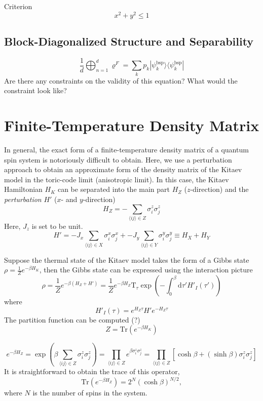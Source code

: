 \documentclass[12font]{article}
\numberwithin{equation}{section}    %
\theoremstyle{definition}
\newcommand{\bra}[1]{\langle #1 |}
\newcommand{\ket}[1]{| #1 \rangle}
\newcommand{\anglelr}[1]{\langle #1 \rangle}
\newcommand{\lr}[1]{\left(  #1  \right)}
\newcommand{\lrm}[1]{\left[  #1  \right]}
\newcommand{\mrm}[1]{\mathrm{#1}}
\newcommand{\alert}[1]{{\color{red}#1}}
\newcommand{\Tr}{\mrm{Tr}}
\begin{document}
Criterion
\[
x^2 + y^2 \leq 1
\]

\subsection{Block-Diagonalized Structure and Separability}

\[
\frac{1}{d}\bigoplus_{n=1}^{d}\varrho^F = \sum_{k} p_k \ket{\psi^{\mrm{bsp}}_k} \bra{\psi^{\mrm{bsp}}_k}
\]
Are there any constraints on the validity of this equation? What would the constraint look like?

\section{Finite-Temperature Density Matrix}
In general, the exact form of a finite-temperature density matrix of a quantum spin system is notoriously difficult to obtain. Here, we use a perturbation approach to obtain an approximate form of the density matrix of the Kitaev model in the toric-code limit (anisotropic limit). In this case, the Kitaev Hamiltonian $H_K$ can be separated into the main part $H_Z$ ($z$-direction) and the \textit{perturbation} $H'$ ($x$- and $y$-direction)
\[
H_Z = -\sum_{\anglelr{ij} \in Z}\sigma^z_i \sigma^z_j
\]
Here, $J_z$ is set to be unit.
\[
H' 
= 
-J_x\sum_{\anglelr{ij} \in X}\sigma^x_i \sigma^x_j
+
-J_y\sum_{\anglelr{ij} \in Y}\sigma^y_i \sigma^y_j
\equiv
H_X + H_Y
\]

Suppose the thermal state of the Kitaev model takes the form of a Gibbs state $\rho = \frac{1}{Z}e^{-\beta H_K}$, then the Gibbs state can be expressed using the interaction picture
\begin{equation}
    \rho = \frac{1}{Z} e^{-\beta\lr{H_Z + H'}} = \frac{1}{Z} e^{-\beta H_Z} 
    \mrm{T}_\tau \exp\lr{-\int_{0}^{\beta}\mrm{d}\tau' H'_I(\tau')}
\end{equation}
where
\begin{equation}
    H'_I(\tau) = e^{H_Z\tau} H' e^{-H_Z\tau}
\end{equation}
The partition function can be computed \alert{(?)}
\[
Z = \Tr\lr{e^{-\beta H_K}}
\]

\[
e^{-\beta H_Z} = \exp \lr{\beta \sum_{\anglelr{ij}\in Z} \sigma^z_i\sigma^z_j} = \prod_{\anglelr{ij}\in Z}e^{\beta \sigma^z_i\sigma^z_j} = \prod_{\anglelr{ij}\in Z}\lrm{\cosh\beta + \lr{\sinh\beta}\sigma^z_i\sigma^z_j}
\]
It is straightforward to obtain the trace of this operator,
\[
\Tr\lr{e^{-\beta H_Z}} = 2^N\lr{\cosh\beta}^{N/2},
\]
where $N$ is the number of spins in the system.
\end{document}
